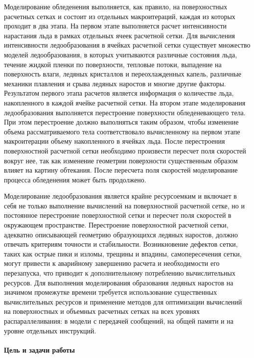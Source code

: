 \documentclass[a4paper,14pt]{extarticle}                     %
\theoremstyle{plain}                                         %
\begin{document}
Моделирование обледенения выполняется, как правило, на поверхностных расчетных сетках и состоит из отдельных макроитераций, каждая из которых проходит в два этапа.
На первом этапе выполняется расчет интенсивности нарастания льда в рамках отдельных ячеек расчетной сетки.
Для вычисления интенсивности ледообразования в ячейках расчетной сетки существует множество моделей ледообразования, в которых учитываются различные состояния льда, течение жидкой пленки по поверхности, тепловые потоки, выпадение на поверхность влаги, ледяных кристаллов и переохлажденных капель, различные механики плавления и срыва ледяных наростов и многие другие факторы.
Результатом первого этапа расчетов является информация о количестве льда, накопленного в каждой ячейке расчетной сетки.
На втором этапе моделирования ледообразования выполняется перестроение поверхности обледеневающего тела.
При этом перестроение должно выполняться таким образом, чтобы изменение объема рассматриваемого тела соответствовало вычисленному на первом этапе макроитерации объему накопленного в ячейках льда.
После перестроения поверхностной расчетной сетки необходимо произвести пересчет поля скоростей вокруг нее, так как изменение геометрии поверхности существенным образом влияет на картину обтекания.
После пересчета поля скоростей моделирование процесса обледенения может быть продолжено.

Моделирование ледообразования является крайне ресурсоемким и включает в себя не только выполнение вычислений на поверхностной расчетной сетке, но и постоянное перестроение поверхностной сетки и пересчет поля скоростей в окружающем пространстве.
Перестроение поверхностной расчетной сетки, адекватно описывающей геометрию образующихся ледяных наростов, должно отвечать критериям точности и стабильности.
Возникновение дефектов сетки, таких как острые пики и изломы, трещины и впадины, самопересечения сетки, могут привести к аварийному завершению расчета и необходимости его перезапуска, что приводит к дополнительному потреблению вычислительных ресурсов. 
Для выполнения моделирования образования ледяных наростов на значимом промежутке времени требуется использование существенных вычислительных ресурсов и применение методов для оптимизации вычислений на поверхностных и объемных расчетных сетках на всех уровнях распараллеливания: в модели с передачей сообщений, на общей памяти и на уровне отдельных инструкций.

\paragraph{Цель и задачи работы} \
\end{document}
